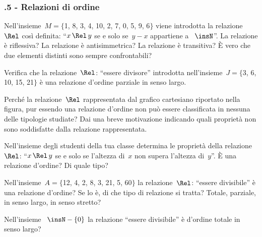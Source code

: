 \begin{multicols}{2}
\subsubsection*{\thechapter.5 - Relazioni di ordine}
\begin{esercizio}
\label{ese:\thechapter.38}
Nell'insieme~$M =\{$1, 8, 3, 4, 10, 2, 7, 0, 5, 9, 6$\}$ viene introdotta la relazione~$\Rel$ così definita: ``$x \,\Rel\, y$ se e solo se~$y-x$ appartiene a ~$\insN$''.
La relazione è riflessiva? La relazione è antisimmetrica? La relazione è transitiva? \`E vero che due elementi
distinti sono sempre confrontabili?
\end{esercizio}

\begin{esercizio}
\label{ese:\thechapter.39}
Verifica che la relazione~$\Rel$: ``essere divisore'' introdotta nell'insieme~$J =\{$3, 6, 10, 15, 21$\}$ è una relazione d'ordine parziale in senso largo.
\end{esercizio}

\begin{esercizio}
\label{ese:\thechapter.40}
Perché la relazione~$\Rel$ rappresentata dal grafico cartesiano riportato nella figura, %
pur essendo una relazione d'ordine non può essere
classificata in nessuna delle tipologie studiate? Dai una breve motivazione indicando quali proprietà non sono soddisfatte dalla relazione rappresentata.
\begin{center}

\end{center}
\end{esercizio}

\begin{esercizio}
\label{ese:\thechapter.41}
Nell'insieme degli studenti della tua classe determina le proprietà della relazione~$\Rel$: ``$x \,\Rel\, y$ se e solo se l'altezza di~$x$ non supera l'altezza di~$y$''. \`E una relazione d'ordine? Di quale tipo?
\end{esercizio}

\begin{esercizio}
\label{ese:\thechapter.42}
Nell'insieme~$A = \{$12, 4, 2, 8, 3, 21, 5, 60$\}$ la relazione~$\Rel$: ``essere divisibile'' è una relazione d'ordine? Se lo è, di che tipo di relazione si tratta? Totale, parziale, in senso largo, in senso stretto?
\end{esercizio}

\begin{esercizio}
\label{ese:\thechapter.43}
Nell'insieme ~$\insN - \{ 0 \}$ la relazione ``essere divisibile'' è d'ordine totale in senso largo?
\end{esercizio}

\end{multicols}

